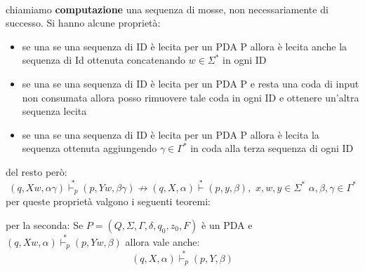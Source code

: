 \\
chiamiamo \textbf{computazione }una sequenza di mosse, non necessariamente di successo. Si hanno alcune proprietà:
\begin{itemize}
	\item se una se una sequenza di ID è lecita per un PDA P allora è lecita anche la sequenza di Id ottenuta concatenando $w\in\Sigma^*$ in ogni ID
	\item se una se una sequenza di ID è lecita per un PDA P e resta una coda di input non consumata allora posso rimuovere tale coda in ogni ID e ottenere un'altra sequenza lecita
	\item se una se una sequenza di ID è lecita per un PDA P allora  è lecita la sequenza ottenuta aggiungendo $\gamma\in\Gamma^*$ in coda alla terza sequenza di ogni ID
\end{itemize}
del resto però:
$$(q,Xw,\alpha\gamma) \stackrel{*}{\vdash_p} (p,Yw,\beta\gamma)\not\to (q,X,\alpha) \stackrel{*}{\vdash}(p,y,\beta),\,\,x,w,y\in\Sigma^*\,\,\alpha,\beta,\gamma\in\Gamma^*$$
per queste proprietà valgono i seguenti teoremi:
\begin{theorem}
	per la seconda:
	Se $P=(Q,\Sigma,\Gamma,\delta,q_0,z_0,F)$ è un PDA e $(q,Xw,\alpha) \stackrel{*}{\vdash_p} (p,Yw,\beta)$ allora vale anche:
	$$(q,X,\alpha) \stackrel{*}{\vdash_p} (p,Y,\beta)$$
\end{theorem}
